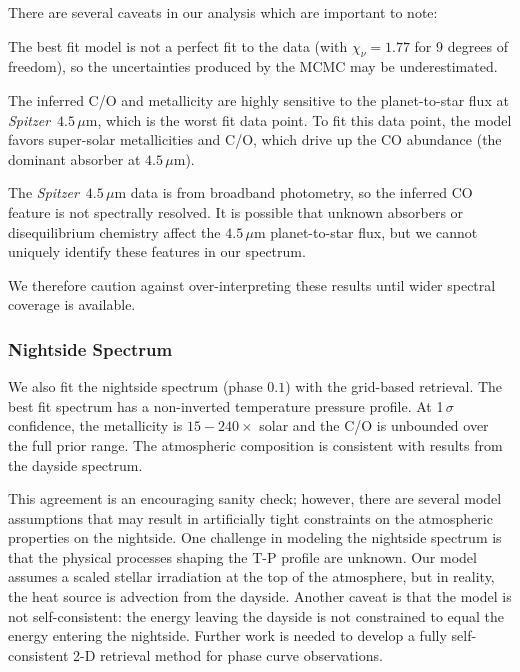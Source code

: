 \documentclass[twocolumn, trackchanges]{aastex61}
\newcommand{\project}[1]{\textsl{#1}}
\newcommand{\Spitzer}{\project{Spitzer}}
\newenvironment{my_itemize}{
    \begin{itemize}
              \setlength{\itemsep}{1pt}
                    \setlength{\parskip}{0pt}
                      \setlength{\parsep}{0pt}}{\end{itemize}
                      }
\begin{document}
There are several caveats in our analysis which are important to note:
\begin{my_itemize}
    \item {The best fit model is not a perfect fit to the data (with $\chi_\nu = 1.77$ for 9 degrees of freedom), so the uncertainties produced by the MCMC may be underestimated.} 
    \item {The inferred C/O and metallicity are highly sensitive to the planet-to-star flux at \Spitzer\ $4.5\,\mu$m, which is the worst fit data point. To fit this data point, the model favors super-solar metallicities and C/O, which drive up the CO abundance (the dominant absorber at $4.5\,\mu$m).}
    \item{The \Spitzer\ $4.5\,\mu$m data is from broadband photometry, so the inferred CO feature is not spectrally resolved. It is possible that unknown absorbers or disequilibrium chemistry affect the $4.5\,\mu$m planet-to-star flux, but we cannot uniquely identify these features in our spectrum.}
\end{my_itemize}
We therefore caution against over-interpreting these results until wider spectral coverage is available.


\subsubsection{Nightside Spectrum}
We also fit the nightside spectrum (phase $0.1$) with the grid-based retrieval. The best fit spectrum has a non-inverted temperature pressure profile.  At 1\,$\sigma$ confidence, the metallicity is $15 - 240\times$ solar and the C/O is unbounded over the full prior range. The atmospheric composition is consistent with results from the dayside spectrum. 

This agreement is an encouraging sanity check; however, there are several model assumptions that may result in artificially tight constraints on the atmospheric properties on the nightside.  One challenge in modeling the nightside spectrum is that the physical processes shaping the T-P profile are unknown.  Our model assumes a scaled stellar irradiation at the top of the atmosphere, but in reality, the heat source is advection from the dayside. Another caveat is that the model is not self-consistent: the energy leaving the dayside is not constrained to equal the energy entering the nightside.  Further work is needed to develop a fully self-consistent 2-D retrieval method for phase curve observations. 
\end{document}
